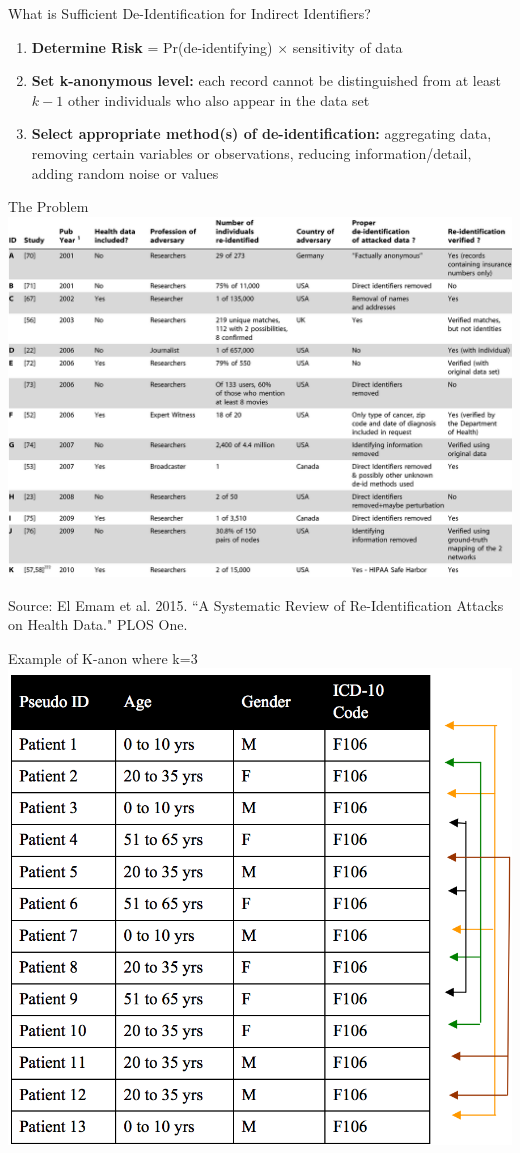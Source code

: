 \documentclass[12pt, compress]{beamer} %
\let\noteitem\item %
\renewcommand{\item}{ 
	\noteitem\vspace{\fill}
	}
\begin{document}
	\begin{frame}{What is Sufficient De-Identification for Indirect Identifiers?}
	
		\begin{enumerate}
			\item \textbf{Determine Risk} = Pr(de-identifying) $\times$ sensitivity of data
			\item \textbf{Set k-anonymous level:} each record cannot be distinguished from at least $k-1$ other individuals who also appear in the data set
			\item \textbf{Select appropriate method(s) of de-identification:} aggregating data, removing certain variables or observations, reducing information/detail, adding random noise or values 
		\end{enumerate}
	\end{frame}
	
	\begin{frame}{The Problem}
		 \centering \includegraphics[width=.85\textwidth]{reidentification.png}
		 
		 \tiny{Source: El Emam et al. 2015. ``A Systematic Review of Re-Identification Attacks on Health Data." PLOS One. }
	\end{frame}
	
	\begin{frame}{Example of K-anon where k=3}
			 \centering \includegraphics[width=.6\textwidth]{images/k-3.png}
	\end{frame}
	
\end{document}
